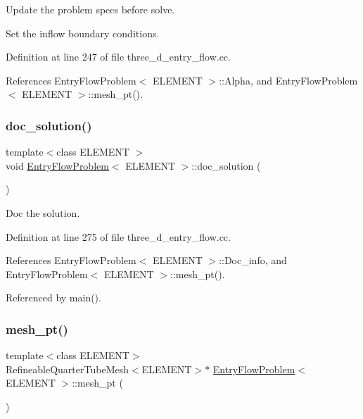 Update the problem specs before solve. 

Set the inflow boundary conditions. 

Definition at line 247 of file three\+\_\+d\+\_\+entry\+\_\+flow.\+cc.



References Entry\+Flow\+Problem$<$ E\+L\+E\+M\+E\+N\+T $>$\+::\+Alpha, and Entry\+Flow\+Problem$<$ E\+L\+E\+M\+E\+N\+T $>$\+::mesh\+\_\+pt().

\mbox{\label{classEntryFlowProblem_a8ba37cd2a4af4356e4182929027d7828}} 
\subsubsection{\texorpdfstring{doc\+\_\+solution()}{doc\_solution()}}
{\footnotesize\ttfamily template$<$class E\+L\+E\+M\+E\+NT $>$ \\
void \hyperlink{classEntryFlowProblem}{Entry\+Flow\+Problem}$<$ E\+L\+E\+M\+E\+NT $>$\+::doc\+\_\+solution (\begin{DoxyParamCaption}{ }\end{DoxyParamCaption})}



Doc the solution. 



Definition at line 275 of file three\+\_\+d\+\_\+entry\+\_\+flow.\+cc.



References Entry\+Flow\+Problem$<$ E\+L\+E\+M\+E\+N\+T $>$\+::\+Doc\+\_\+info, and Entry\+Flow\+Problem$<$ E\+L\+E\+M\+E\+N\+T $>$\+::mesh\+\_\+pt().



Referenced by main().

\mbox{\label{classEntryFlowProblem_a4a880eeef280b621728ecceea42fe3ff}} 
\subsubsection{\texorpdfstring{mesh\+\_\+pt()}{mesh\_pt()}}
{\footnotesize\ttfamily template$<$class E\+L\+E\+M\+E\+NT$>$ \\
Refineable\+Quarter\+Tube\+Mesh$<$E\+L\+E\+M\+E\+NT$>$$\ast$ \hyperlink{classEntryFlowProblem}{Entry\+Flow\+Problem}$<$ E\+L\+E\+M\+E\+NT $>$\+::mesh\+\_\+pt (\begin{DoxyParamCaption}{ }\end{DoxyParamCaption})\hspace{0.3cm}{\ttfamily [inline]}}



